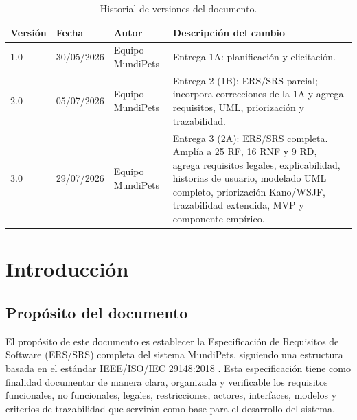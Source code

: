 \documentclass[journal,onecolumn]{IEEEtran}
\begin{document}
	\begin{table}[H]
		\centering
		\caption{Historial de versiones del documento.}
		\label{tab:historial}
		\small
		\begin{tabularx}{\textwidth}{@{}l l l X@{}}
			\toprule
			\textbf{Versión} & \textbf{Fecha} & \textbf{Autor} & \textbf{Descripción del cambio} \\
			\midrule
			1.0 & 30/05/2026 & Equipo MundiPets & Entrega 1A: planificación y elicitación. \\
			2.0 & 05/07/2026 & Equipo MundiPets & Entrega 2 (1B): ERS/SRS parcial; incorpora correcciones de la 1A y agrega requisitos, UML, priorización y trazabilidad. \\
			3.0 & 29/07/2026 & Equipo MundiPets & Entrega 3 (2A): ERS/SRS completa. Amplía a 25 RF, 16 RNF y 9 RD, agrega requisitos legales, explicabilidad, historias de usuario, modelado UML completo, priorización Kano/WSJF, trazabilidad extendida, MVP y componente empírico. \\
			\bottomrule
		\end{tabularx}
	\end{table}
	
	\newpage
	\tableofcontents
	\newpage
	\listoffigures
	\listoftables
	\lstlistoflistings
	\newpage
	
	\section{Introducción}
	
	\subsection{Propósito del documento}
	\label{sec:proposito}
	
	El propósito de este documento es establecer la Especificación de Requisitos de
	Software (ERS/SRS) completa del sistema MundiPets, siguiendo una estructura
	basada en el estándar IEEE/ISO/IEC 29148:2018 \cite{iso29148}. Esta
	especificación tiene como finalidad documentar de manera clara, organizada y
	verificable los requisitos funcionales, no funcionales, legales, restricciones,
	actores, interfaces, modelos y criterios de trazabilidad que servirán como base
	para el desarrollo del sistema.
	
\end{document}
